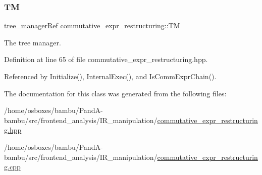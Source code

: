 \subsubsection{\texorpdfstring{TM}{TM}}
{\footnotesize\ttfamily \hyperlink{tree__manager_8hpp_a96ff150c071ce11a9a7a1e40590f205e}{tree\+\_\+manager\+Ref} commutative\+\_\+expr\+\_\+restructuring\+::\+TM\hspace{0.3cm}{\ttfamily [private]}}



The tree manager. 



Definition at line 65 of file commutative\+\_\+expr\+\_\+restructuring.\+hpp.



Referenced by Initialize(), Internal\+Exec(), and Is\+Comm\+Expr\+Chain().



The documentation for this class was generated from the following files\+:\begin{DoxyCompactItemize}
\item 
/home/osboxes/bambu/\+Pand\+A-\/bambu/src/frontend\+\_\+analysis/\+I\+R\+\_\+manipulation/\hyperlink{commutative__expr__restructuring_8hpp}{commutative\+\_\+expr\+\_\+restructuring.\+hpp}\item 
/home/osboxes/bambu/\+Pand\+A-\/bambu/src/frontend\+\_\+analysis/\+I\+R\+\_\+manipulation/\hyperlink{commutative__expr__restructuring_8cpp}{commutative\+\_\+expr\+\_\+restructuring.\+cpp}\end{DoxyCompactItemize}
